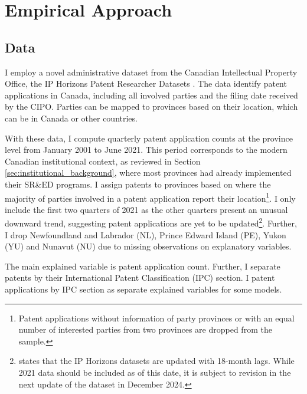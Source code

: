 \documentclass[../main.tex]{subfiles}
\begin{document}
\section{Empirical Approach}
\label{sec:empirical_strategy}

\subsection{Data}

I employ a novel administrative dataset from the Canadian Intellectual Property Office, the IP Horizons Patent Researcher Datasets \parencite*{canadianintellectualpropertyoffice23}. The data identify patent applications in Canada, including all involved parties and the filing date received by the CIPO. Parties can be mapped to provinces based on their location, which can be in Canada or other countries. 


With these data, I compute quarterly patent application counts at the province level from January 2001 to June 2021. This period corresponds to the modern Canadian institutional context, as reviewed in Section \ref{sec:institutional_background}, where most provinces had already implemented their SR\&ED programs. I assign patents to provinces based on where the majority of parties involved in a patent application report their location\footnote{Patent applications without information of party provinces or with an equal number of interested parties from two provinces are dropped from the sample.}. I only include the first two quarters of 2021 as the other quarters present an unusual downward trend, suggesting patent applications are yet to be updated\footnote{\textcite{canadianintellectualpropertyoffice23} states that the IP Horizons datasets are updated with 18-month lags. While 2021 data should be included as of this date, it is subject to revision in the next update of the dataset in December 2024.}. Further, I drop Newfoundland and Labrador (NL), Prince Edward Island (PE), Yukon (YU) and Nunavut (NU) due to missing observations on explanatory variables. 


The main explained variable is patent application count. Further, I separate patents by their International Patent Classification (IPC) section. I patent applications by IPC section as separate explained variables for some models.
\end{document}
